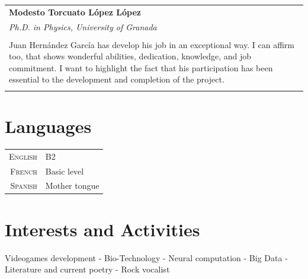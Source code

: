 \documentclass[a4paper,10pt]{article} %
\begin{document}
\begin{tabular}{p{146mm}}

\textbf{Modesto Torcuato López López} \\
\emph{Ph.D. in Physics, University of Granada}\\ \\
Juan Hernández García has develop his job in an exceptional way. I can affirm
too, that shows wonderful abilities, dedication, knowledge, and job commitment.
I want to highlight the fact that his participation has been essential to the
development and completion of the project. \\
\multicolumn{1}{c}{}
\end{tabular}


\section{Languages}
\begin{tabular}{r|p{11cm}}
\textsc{English} & B2\\
\textsc{French} & Basic level\\ 
\textsc{Spanish} & Mother tongue\\

\end{tabular}

\framebox[\linewidth]{\textcolor{linkcolour}{Experience working in international
 teams}}\par





\section{Interests and Activities}
Videogames development - Bio-Technology - Neural computation - Big Data -
Literature and current poetry - Rock vocalist
\end{document}
